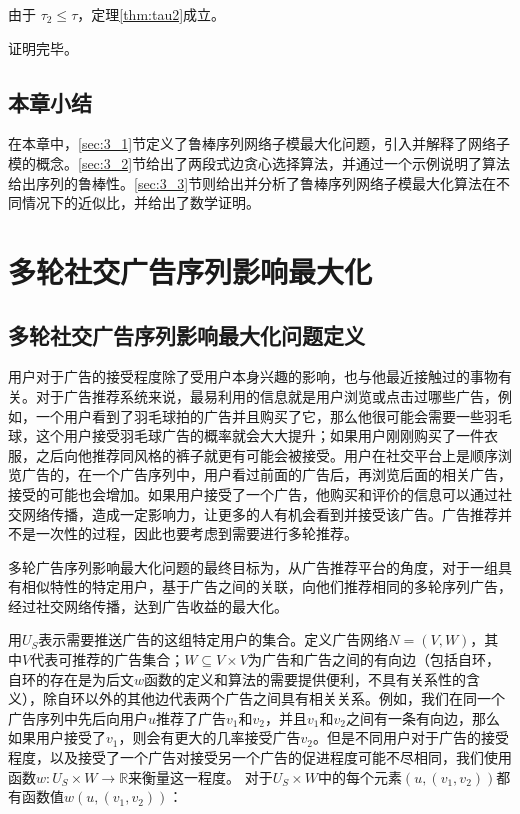由于 $\tau_2 \le \tau$，定理\ref{thm:tau2}成立。

\noindent 证明完毕。


\section{本章小结}
在本章中，\ref{sec:3_1}节定义了鲁棒序列网络子模最大化问题，引入并解释了网络子模的概念。\ref{sec:3_2}节给出了两段式边贪心选择算法，并通过一个示例说明了算法给出序列的鲁棒性。\ref{sec:3_3}节则给出并分析了鲁棒序列网络子模最大化算法在不同情况下的近似比，并给出了数学证明。


\chapter{多轮社交广告序列影响最大化}

\section{多轮社交广告序列影响最大化问题定义}
\label{sec:def}
用户对于广告的接受程度除了受用户本身兴趣的影响，也与他最近接触过的事物有关。对于广告推荐系统来说，最易利用的信息就是用户浏览或点击过哪些广告，例如，一个用户看到了羽毛球拍的广告并且购买了它，那么他很可能会需要一些羽毛球，这个用户接受羽毛球广告的概率就会大大提升；如果用户刚刚购买了一件衣服，之后向他推荐同风格的裤子就更有可能会被接受。用户在社交平台上是顺序浏览广告的，在一个广告序列中，用户看过前面的广告后，再浏览后面的相关广告，接受的可能也会增加。如果用户接受了一个广告，他购买和评价的信息可以通过社交网络传播，造成一定影响力，让更多的人有机会看到并接受该广告。广告推荐并不是一次性的过程，因此也要考虑到需要进行多轮推荐。

多轮广告序列影响最大化问题的最终目标为，从广告推荐平台的角度，对于一组具有相似特性的特定用户，基于广告之间的关联，向他们推荐相同的多轮序列广告，经过社交网络传播，达到广告收益的最大化。

用$U_S$表示需要推送广告的这组特定用户的集合。定义广告网络$N=(V,W)$，其中$V$代表可推荐的广告集合；$W\subseteq V \times V$为广告和广告之间的有向边（包括自环，自环的存在是为后文$w$函数的定义和算法的需要提供便利，不具有关系性的含义），除自环以外的其他边代表两个广告之间具有相关关系。例如，我们在同一个广告序列中先后向用户$u$推荐了广告$v_1$和$v_2$，并且$v_1$和$v_2$之间有一条有向边，那么如果用户接受了$v_1$，则会有更大的几率接受广告$v_2$。但是不同用户对于广告的接受程度，以及接受了一个广告对接受另一个广告的促进程度可能不尽相同，我们使用函数$w:U_S \times W \to \mathbb{R}$来衡量这一程度。 对于$U_S \times W$中的每个元素$(u,(v_1,v_2))$都有函数值$w(u,(v_1,v_2))$：

